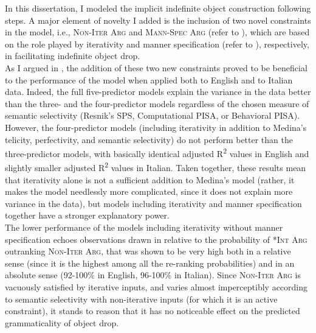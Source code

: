In this dissertation, I modeled the implicit indefinite object construction following  steps. A major element of novelty I added is the inclusion of two novel constraints in the model, i.e., \textsc{Non-Iter Arg} and \textsc{Mann-Spec Arg} (refer to ), which are based on the role played by iterativity and manner specification (refer to ), respectively, in facilitating indefinite object drop.\\
As I argued in , the addition of these two new constraints proved to be beneficial to the performance of the model when applied both to English and to Italian data. Indeed, the full five-predictor models explain the variance in the data better than the three- and the four-predictor models regardless of the chosen measure of semantic selectivity (Resnik's SPS, Computational PISA, or Behavioral PISA). However, the four-predictor models (including iterativity in addition to Medina's telicity, perfectivity, and semantic selectivity) do not perform better than the three-predictor models, with basically identical adjusted R\textsuperscript{2} values in English and slightly smaller adjusted R\textsuperscript{2} values in Italian. Taken together, these results mean that iterativity alone is not a sufficient addition to Medina's model (rather, it makes the model needlessly more complicated, since it does not explain more variance in the data), but models including iterativity and manner specification together have a stronger explanatory power.\\
The lower performance of the models including iterativity without manner specification echoes observations drawn in  relative to the probability of \textsc{*Int Arg} outranking \textsc{Non-Iter Arg}, that was shown to be very high both in a relative sense (since it is the highest among all the re-ranking probabilities) and in an absolute sense (92-100\% in English, 96-100\% in Italian). Since \textsc{Non-Iter Arg} is vacuously satisfied by iterative inputs, and varies almost imperceptibly according to semantic selectivity with non-iterative inputs (for which it is an active constraint), it stands to reason that it has no noticeable effect on the predicted grammaticality of object drop.\\
